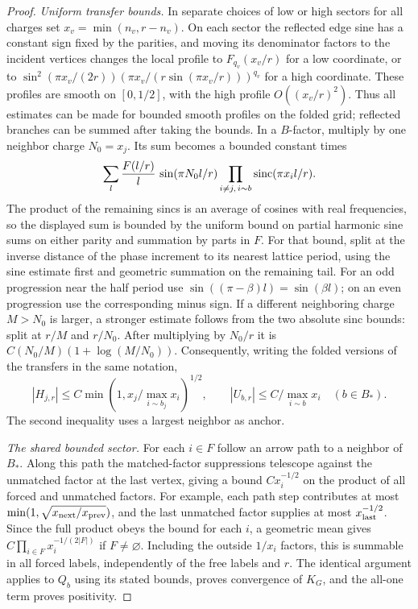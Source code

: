 \begin{proof}
\emph{Uniform transfer bounds.}
In separate choices of low or high sectors for all charges set \(x_v=\min(n_v,r-n_v)\). On each sector the reflected edge sine has a constant sign fixed by the parities, and moving its denominator factors to the incident vertices changes the local profile to \(F_{q_v}(x_v/r)\) for a low coordinate, or to
\(\sin^2(\pi x_v/(2r))(\pi x_v/(r\sin(\pi x_v/r)))^{q_v}\)
for a high coordinate. These profiles are smooth on \([0,1/2]\), with the high profile \(O((x_v/r)^2)\). Thus all estimates can be made for bounded smooth profiles on the folded grid; reflected branches can be summed after taking the bounds. In a \(B\)-factor, multiply by one neighbor charge \(N_0=x_j\). Its sum becomes a bounded constant times
\[
 \sum_l \frac{F(l/r)}l\,\sin(\pi N_0l/r)
                      \prod_{i\ne j,\,i\sim b}\operatorname{sinc}(\pi x_i l/r).
\]
The product of the remaining sincs is an average of cosines with real frequencies, so the displayed sum is bounded by the uniform bound on partial harmonic sine sums on either parity and summation by parts in \(F\). For that bound, split at the inverse distance of the phase increment to its nearest lattice period, using the sine estimate first and geometric summation on the remaining tail. For an odd progression near the half period use \(\sin((\pi-\beta)l)=\sin(\beta l)\); on an even progression use the corresponding minus sign. If a different neighboring charge \(M>N_0\) is larger, a stronger estimate follows from the two absolute sinc bounds: split at \(r/M\) and \(r/N_0\). After multiplying by \(N_0/r\) it is \(C(N_0/M)(1+\log(M/N_0))\). Consequently, writing the folded versions of the transfers in the same notation,
\[
 |H_{j,r}|\le C \min(1,x_j/\max_{i\sim b_j}x_i)^{1/2},
 \qquad |U_{b,r}|\le C/\max_{i\sim b}x_i\quad(b\in B_*).
\]
The second inequality uses a largest neighbor as anchor.

\emph{The shared bounded sector.}
For each \(i\in F\) follow an arrow path to a neighbor of \(B_*\). Along this path the matched-factor suppressions telescope against the unmatched factor at the last vertex, giving a bound \(C x_i^{-1/2}\) on the product of all forced and unmatched factors. For example, each path step contributes at most \(\min(1,\sqrt{x_{\rm next}/x_{\rm prev}})\), and the last unmatched factor supplies at most \(x_{\rm last}^{-1/2}\). Since the full product obeys the bound for each \(i\), a geometric mean gives \(C\prod_{i\in F}x_i^{-1/(2|F|)}\) if \(F\ne\varnothing\). Including the outside \(1/x_i\) factors, this is summable in all forced labels, independently of the free labels and \(r\). The identical argument applies to \(Q_b\) using its stated bounds, proves convergence of \(K_G\), and the all-one term proves positivity.


\end{proof}
